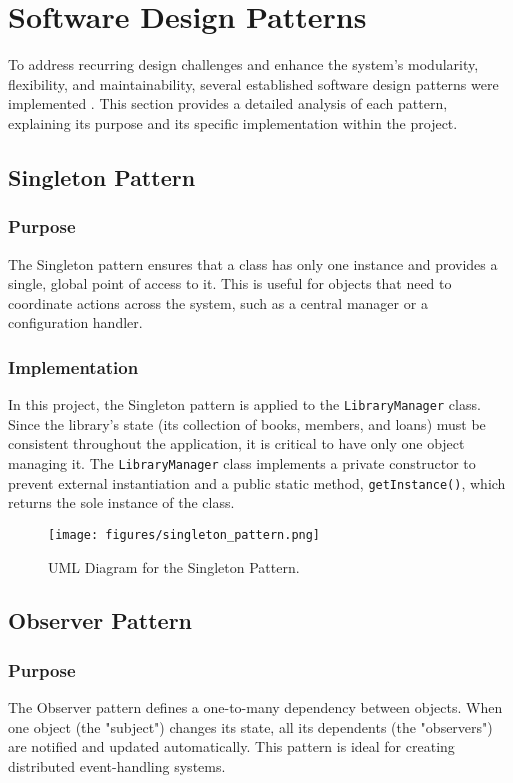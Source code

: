 \section{Software Design Patterns}
\label{sec:design_patterns}

To address recurring design challenges and enhance the system's modularity, flexibility, and maintainability, several established software design patterns were implemented \cite{GoF1994}. This section provides a detailed analysis of each pattern, explaining its purpose and its specific implementation within the project.

\subsection{Singleton Pattern}
\subsubsection{Purpose}
The Singleton pattern ensures that a class has only one instance and provides a single, global point of access to it. This is useful for objects that need to coordinate actions across the system, such as a central manager or a configuration handler.

\subsubsection{Implementation}
In this project, the Singleton pattern is applied to the \texttt{LibraryManager} class. Since the library's state (its collection of books, members, and loans) must be consistent throughout the application, it is critical to have only one object managing it. The \texttt{LibraryManager} class implements a private constructor to prevent external instantiation and a public static method, \texttt{getInstance()}, which returns the sole instance of the class.

\begin{figure}[H]
    \centering
    \texttt{[image: figures/singleton\_pattern.png]}
    \caption{UML Diagram for the Singleton Pattern.}
    \label{fig:singleton_pattern}
\end{figure}

\subsection{Observer Pattern}
\subsubsection{Purpose}
The Observer pattern defines a one-to-many dependency between objects. When one object (the "subject") changes its state, all its dependents (the "observers") are notified and updated automatically. This pattern is ideal for creating distributed event-handling systems.

